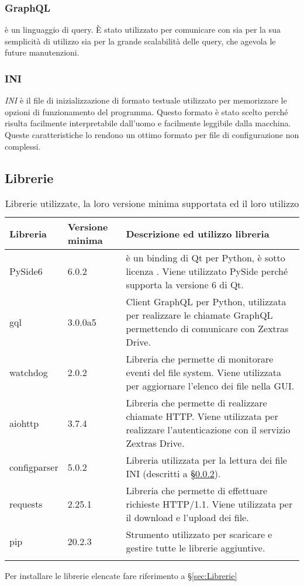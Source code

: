 \subsubsection{GraphQL}
 è un linguaggio di query. È stato utilizzato per comunicare con  sia per la sua semplicità di utilizzo sia per la grande scalabilità delle query, che agevola le future manutenzioni.
\subsubsection{INI} \label{sec:ini}
\textit{INI} è il file di inizializzazione di formato testuale utilizzato per memorizzare le opzioni di funzionamento del programma. Questo formato è stato scelto perché risulta facilmente interpretabile dall'uomo e facilmente leggibile dalla macchina. Queste caratteristiche lo rendono un ottimo formato per file di configurazione non complessi.
\newpage{}
\subsection{Librerie} \label{sec:librerie_installate}
{
	\setlength{\freewidth}{\dimexpr\textwidth-1\tabcolsep}
	\renewcommand{\arraystretch}{1.5}
	\setlength{\aboverulesep}{0pt}
	\setlength{\belowrulesep}{0pt}
	\begin{longtable}{L{.15\freewidth} L{.15\freewidth} L{.70\freewidth}}
		\textbf{Libreria} & \textbf{Versione minima} & \textbf{Descrizione ed utilizzo libreria}\\
		\toprule
		\endhead
		PySide6 & 6.0.2 &  è un binding di Qt per Python, è sotto licenza . Viene utilizzato PySide perché supporta la versione 6 di Qt.\\
		gql & 3.0.0a5 & Client GraphQL per Python, utilizzata per realizzare le chiamate GraphQL permettendo di comunicare con Zextras Drive.\\
		watchdog & 2.0.2 & Libreria che permette di monitorare eventi del file system. Viene utilizzata per aggiornare l'elenco dei file nella GUI.\\
		aiohttp & 3.7.4 & Libreria che permette di realizzare chiamate HTTP. Viene utilizzata per realizzare l'autenticazione con il servizio Zextras Drive.\\
		configparser & 5.0.2 & Libreria utilizzata per la lettura dei file INI (descritti a \S{}\ref{sec:ini}).\\
		requests & 2.25.1 & Libreria che permette di effettuare richieste HTTP/1.1. Viene utilizzata per il download e l'upload dei file.\\
		pip & 20.2.3 & Strumento utilizzato per scaricare e gestire tutte le librerie aggiuntive.\\
		\bottomrule
		\hiderowcolors
		\caption{Librerie utilizzate, la loro versione minima supportata ed il loro utilizzo}
	\end{longtable}
}
Per installare le librerie elencate fare riferimento a \S{}\ref{sec:Librerie}
